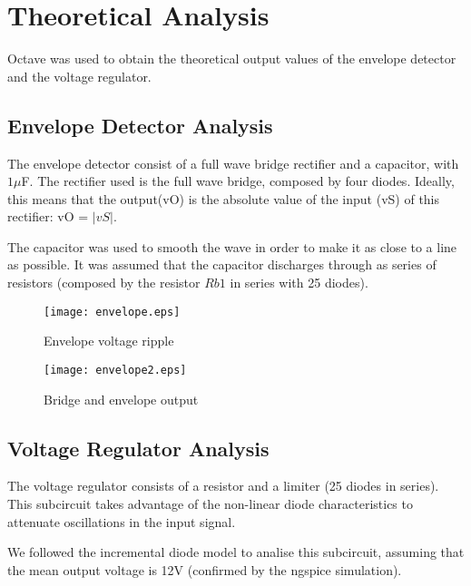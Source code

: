 \section{Theoretical Analysis} \label{sec:analysis}


Octave was used to obtain the theoretical output values of the envelope detector and the voltage regulator. 



\subsection{Envelope Detector Analysis}

The envelope detector consist of a full wave bridge rectifier and a capacitor, with $1\mu$F.
The rectifier used is the full wave bridge, composed by four diodes. Ideally, this means that the output(vO) is the absolute value of the input (vS) of this rectifier: vO = $|vS|$.

The capacitor was used to smooth the wave in order to make it as close to a line as possible. It was assumed that the capacitor discharges through as series of resistors (composed by the resistor $Rb1$ in series with 25 diodes).

\begin{figure}[h] \centering
  \begin{minipage}{.5\textwidth}
    \texttt{[image: envelope.eps]}
    \caption{Envelope voltage ripple}
    \label{fig:simenv}
    \end{minipage}%
  \begin{minipage}{.5\textwidth}
  \centering
    \texttt{[image: envelope2.eps]}
    \caption{Bridge and envelope output}
    \label{fig:compenv}
      \end{minipage}%
\end{figure}




\subsection{Voltage Regulator Analysis}

The voltage regulator consists of a resistor and a limiter (25 diodes in series). This subcircuit takes advantage of the non-linear diode characteristics to attenuate oscillations in the input signal.

We followed the incremental diode model to analise this subcircuit, assuming that the mean output voltage is 12V (confirmed by the ngspice simulation).


